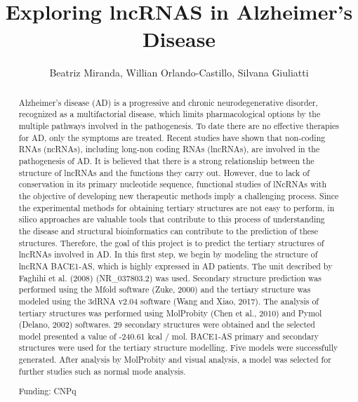 \documentclass[twoside]{article}
\title{\vspace{-15mm}\fontsize{24pt}{10pt}\selectfont\textbf{ Exploring lncRNAS in Alzheimer's Disease }} %
\author{ Beatriz Miranda, Willian Orlando-Castillo, Silvana Giuliatti }
\affil{ University of Cauca }
\date{}
\begin{document}
  
  
  \maketitle %
  
  
  \thispagestyle{fancy} %
  
  
  \begin{abstract}
  Alzheimer's disease (AD) is a progressive and chronic neurodegenerative disorder,  recognized as a multifactorial disease,  which limits pharmacological options by the multiple pathways involved in the pathogenesis. To date there are no effective therapies for AD,  only the symptoms are treated. Recent studies have shown that non-coding RNAs (ncRNAs),  including long-non coding RNAs (lncRNAs),  are involved in the pathogenesis of AD. It is believed that there is a strong relationship between the structure of lncRNAs and the functions they carry out. However,  due to lack of conservation in its primary nucleotide sequence,  functional studies of lNcRNAs with the objective of developing new therapeutic methods imply a challenging process. Since the experimental methods for obtaining tertiary structures are not easy to perform,  in silico approaches are valuable tools that contribute to this process of understanding the disease and structural bioinformatics can contribute to the prediction of these structures. Therefore,  the goal of this project is to predict the tertiary structures of lncRNAs involved in AD. In this first step,  we begin by modeling the structure of lncRNA BACE1-AS,  which is highly expressed in AD patients. The unit described by Faghihi et al. (2008) (NR\_037803.2) was used. Secondary structure prediction was performed using the Mfold software (Zuke,  2000) and the tertiary structure was modeled using the 3dRNA v2.04 software (Wang and Xiao,  2017). The analysis of tertiary structures was performed using MolProbity (Chen et al.,  2010) and Pymol (Delano,  2002) softwares. 29 secondary structures were obtained and the selected model presented a value of -240.61 kcal / mol. BACE1-AS primary and secondary structures were used for the tertiary structure modelling. Five models were successfully generated. After analysis by MolProbity and visual analysis,  a model was selected for further studies such as normal mode analysis.
  
  Funding: CNPq \\ 
  \end{abstract}
  
\end{document}
